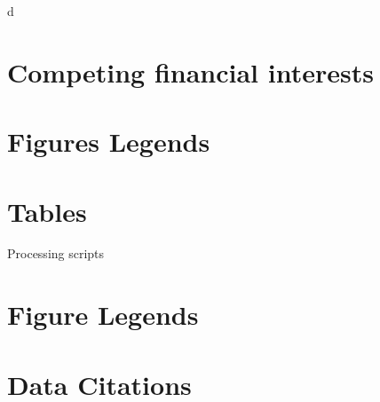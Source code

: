 d\documentclass[english]{article}
\begin{document}
\section*{Competing financial interests}


\section*{Figures Legends}


\section*{Tables}

\begin{table}
    \caption{Processing scripts}
    \label{table:processing-scripts}
\end{table}

\section*{Figure Legends}

\begin{thebibliography}{}

\end{thebibliography}

\section*{Data Citations}
\end{document}
